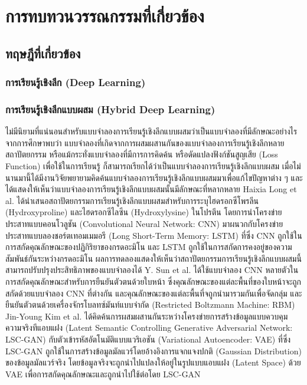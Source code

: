 \chapter{การทบทวนวรรณกรรมที่เกี่ยวข้อง}
\label{chapter:literature-review}

\section{ทฤษฎีที่เกี่ยวข้อง}
\subsection{การเรียนรู้เชิงลึก (Deep Learning)}

\subsection{การเรียนรู้เชิงลึกแบบผสม (Hybrid Deep Learning)}
ไม่มีนิยามที่แน่นอนสำหรับแบบจำลองการเรียนรู้เชิงลึกแบบผสมว่าเป็นแบบจำลองที่มีลักษณะอย่างไร จากการศึกษาพบว่า แบบจำลองที่เกิดจากการผสมผสานกันของแบบจำลองการเรียนรู้เชิงลึกหลายสถาปัตยกรรม หรือแม้กระทั่งแบบจำลองที่มีการการคิดค้น หรือดัดแปลงฟังก์ชันสูญเสีย (Loss Function) เพื่อใช้ในการเรียนรู้ ก็สามารถเรียกได้ว่าเป็นแบบจำลองการเรียนรู้เชิงลึกแบบผสม เมื่อไม่นานมานี้ได้มีงานวิจัยพยายามคิดค้นแบบจำลองการเรียนรู้เชิงลึกแบบผสมมาเพื่อแก้ไขปัญหาต่าง ๆ และได้แสดงให้เห็นว่าแบบจำลองการเรียนรู้เชิงลึกแบบผสมนั้นมีลักษณะที่หลากหลาย Haixia Long et al. \cite{Long:2018} ได้นำเสนอสถาปัตยกรรมการเรียนรู้เชิงลึกแบบผสมสำหรับการระบุไฮดรอกซีโพรลีน (Hydroxyproline) และไฮดรอกซีไลซีน (Hydroxylysine) ในโปรตีน โดยการนำโครงข่ายประสาทแบบคอนโวลูชัน (Convolutional Neural Network: CNN) มาผนวกกับโครงข่ายประสาทแบบลองชอร์ตเทอมเมมอรี (Long Short-Term Memory: LSTM) ที่ซึ่ง CNN ถูกใช้ในการสกัดคุณลักษณะของปฏิกิริยาของกรดอะมิโน และ LSTM ถูกใช้ในการสกัดการคงอยู่ของความสัมพันธ์กันระหว่างกรดอะมิโน ผลการทดลองแสดงให้เห็นว่าสถาปัตยกรรมการเรียนรู้เชิงลึกแบบผสมนี้สามารถปรับปรุงประสิทธิภาพของแบบจำลองได้ Y. Sun et al. \cite{Sun:2016} ได้ใช้แบบจำลอง CNN หลายตัวในการสกัดคุณลักษณะสำหรับการยืนยันตัวตนด้วยใบหน้า ซึ่งคุณลักษณะของแต่ละพื้นที่ของใบหน้าจะถูกสกัดด้วยแบบจำลอง CNN ที่ต่างกัน และคุณลักษณะของแต่ละพื้นที่จถูกนำมารวมกันเพื่อจัดกลุ่ม และยืนยันตัวตนด้วยเครื่องจักรโบลทซ์มันท์แบบจำกัด (Restricted Boltzmann Machine: RBM) Jin-Young Kim et al. \cite{Jin-Young:2018} ได้คิดค้นการผสมผสานกันระหว่างโครงข่ายการสร้างข้อมูลแบบควบคุมความจริงทีแอบแฝง (Latent Semantic Controlling Generative Adversarial Network: LSC-GAN) กับตัวเข้ารหัสอัตโนมัติแบบแวริเอชัน (Variational Autoencoder: VAE) ที่ซึ่ง LSC-GAN ถูกใช้ในการสร้างข้อมูลมัลแวร์โดยอ้างอิงการแจกแจงปกติ (Gaussian Distribution) ของข้อมูลมัลแวร์จริง โดยข้อมูลจริงจะถูกนำไปแปลงให้อยู่ในรูปแบบแอบแฝง (Latent Space) ด้วย VAE เพื่อการสกัดคุณลักษณะและถูกนำไปใช้ต่อโดย LSC-GAN

